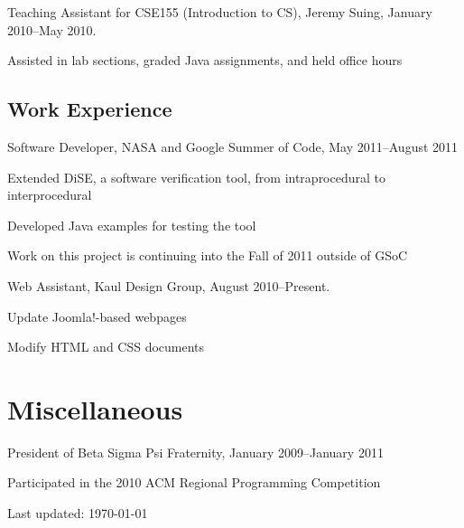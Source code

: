 \documentclass[10pt,letterpaper]{article}
\renewenvironment{itemize}{
  \begin{list}{}{
    \setlength{\leftmargin}{1.5em}
    \setlength{\itemsep}{0.25em}
    \setlength{\parskip}{0pt}
    \setlength{\parsep}{0.25em}
  }
}{
  \end{list}
}
\begin{document}
\begin{itemize}
\item Teaching Assistant for CSE155 (Introduction to CS), Jeremy Suing, January 2010--May 2010.
	\begin{itemize}
	\item Assisted in lab sections, graded Java assignments, and held office hours
	\end{itemize}
\end{itemize}

\subsection*{Work Experience}

\begin{itemize}
	\item Software Developer, NASA and Google Summer of Code, May 2011--August 2011
	\begin{itemize}
		\item Extended DiSE, a software verification tool, from intraprocedural to interprocedural
		\item Developed Java examples for testing the tool
		\item Work on this project is continuing into the Fall of 2011 outside of GSoC
	\end{itemize}
    \item Web Assistant, Kaul Design Group, August 2010--Present.
	\begin{itemize}
	\item Update Joomla!-based webpages
	\item Modify HTML and CSS documents
	\end{itemize}
\end{itemize}

\section*{Miscellaneous}

\begin{itemize}
    \item President of Beta Sigma Psi Fraternity, January 2009--January 2011
    \item Participated in the 2010 ACM Regional Programming Competition
\end{itemize}

\bigskip

\begin{center}
  \begin{small}
    Last updated: \today
  \end{small}
\end{center}
\end{document}

